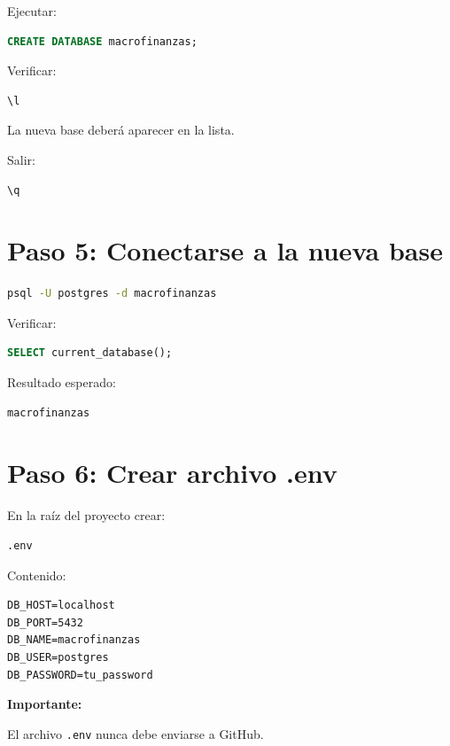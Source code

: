 Ejecutar:

\begin{lstlisting}[language=SQL]
CREATE DATABASE macrofinanzas;
\end{lstlisting}

Verificar:

\begin{lstlisting}[language=SQL]
\l
\end{lstlisting}

La nueva base deberá aparecer en la lista.

Salir:

\begin{lstlisting}[language=SQL]
\q
\end{lstlisting}

\section{Paso 5: Conectarse a la nueva base}

\begin{lstlisting}[language=bash]
psql -U postgres -d macrofinanzas
\end{lstlisting}

Verificar:

\begin{lstlisting}[language=SQL]
SELECT current_database();
\end{lstlisting}

Resultado esperado:

\begin{verbatim}
macrofinanzas
\end{verbatim}

\section{Paso 6: Crear archivo .env}

En la raíz del proyecto crear:

\begin{verbatim}
.env
\end{verbatim}

Contenido:

\begin{lstlisting}
DB_HOST=localhost
DB_PORT=5432
DB_NAME=macrofinanzas
DB_USER=postgres
DB_PASSWORD=tu_password
\end{lstlisting}

\textbf{Importante:}

El archivo \texttt{.env} nunca debe enviarse a GitHub.

